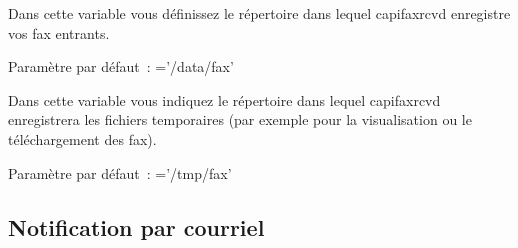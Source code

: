 \begin{description}

    {Dans cette variable vous définissez le répertoire dans lequel capifaxrcvd
	enregistre vos fax entrants.

        Paramètre par défaut~: ='/data/fax'}


    {Dans cette variable vous indiquez le répertoire dans lequel capifaxrcvd enregistrera
	les fichiers temporaires (par exemple pour la visualisation ou le téléchargement des fax).

        Paramètre par défaut~: ='/tmp/fax'}

\end {description}

\subsection{Notification par courriel}

